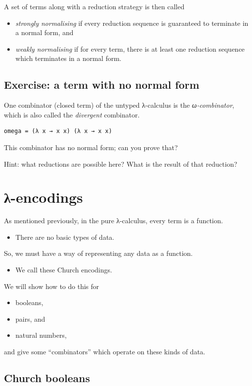 \documentclass[11pt]{article}
\theoremstyle{definition}
\begin{document}
A set of terms along with a reduction strategy is then called
\begin{itemize}
\item \emph{strongly normalising} if every reduction sequence is guaranteed
to terminate in a normal form, and
\item \emph{weakly normalising} if for every term, there is at least one
reduction sequence which terminates in a normal form.
\end{itemize}

\subsection{Exercise: a term with no normal form}
\label{sec:orga22fdb5}

One combinator (closed term) of the untyped λ-calculus
is the \emph{ω-combinator}, which is also called the \emph{divergent} combinator.
\begin{verbatim}
omega = (λ x → x x) (λ x → x x)
\end{verbatim}

This combinator has no normal form; can you prove that?

Hint: what reductions are possible here?
What is the result of that reduction?

\section{λ-encodings}
\label{sec:org3301cfb}
As mentioned previously, in the pure λ-calculus,
every term is a function.
\begin{itemize}
\item There are no basic types of data.
\end{itemize}

So, we must have a way of representing any data as
a function.
\begin{itemize}
\item We call these Church encodings.
\end{itemize}

We will show how to do this for
\begin{itemize}
\item booleans,
\item pairs, and
\item natural numbers,
\end{itemize}
and give some “combinators” which operate on these kinds of data.

\subsection{Church booleans}
\label{sec:org12826ee}
\end{document}
